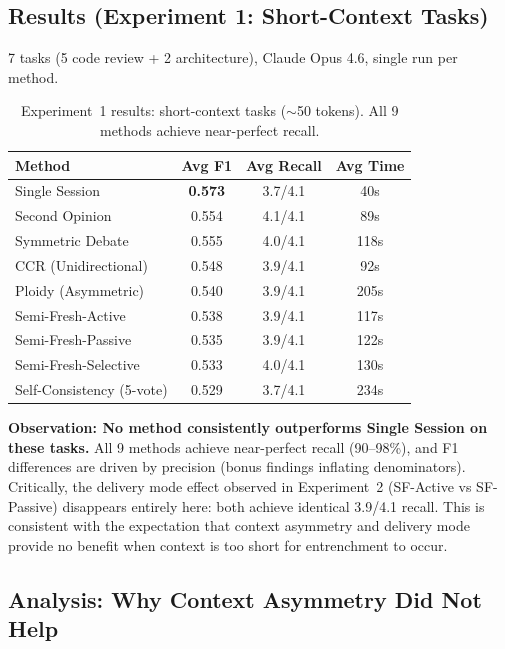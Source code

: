 \documentclass[11pt]{article}
\begin{document}
\subsection{Results (Experiment 1: Short-Context Tasks)}
\label{sec:exp1-results}

7 tasks (5 code review + 2 architecture), Claude Opus 4.6, single run per method.

\begin{table}[t]
\centering
\caption{Experiment~1 results: short-context tasks ($\sim$50 tokens). All 9 methods achieve near-perfect recall.}
\label{tab:exp1}
\small
\begin{tabular}{@{}lccc@{}}
\toprule
\textbf{Method} & \textbf{Avg F1} & \textbf{Avg Recall} & \textbf{Avg Time} \\
\midrule
Single Session            & \textbf{0.573} & 3.7/4.1 & 40s  \\
Second Opinion            & 0.554          & 4.1/4.1 & 89s  \\
Symmetric Debate          & 0.555          & 4.0/4.1 & 118s \\
CCR (Unidirectional)      & 0.548          & 3.9/4.1 & 92s  \\
Ploidy (Asymmetric)       & 0.540          & 3.9/4.1 & 205s \\
Semi-Fresh-Active         & 0.538          & 3.9/4.1 & 117s \\
Semi-Fresh-Passive        & 0.535          & 3.9/4.1 & 122s \\
Semi-Fresh-Selective      & 0.533          & 4.0/4.1 & 130s \\
Self-Consistency (5-vote) & 0.529          & 3.7/4.1 & 234s \\
\bottomrule
\end{tabular}
\end{table}

\textbf{Observation: No method consistently outperforms Single Session on these tasks.} All 9 methods achieve near-perfect recall (90--98\%), and F1 differences are driven by precision (bonus findings inflating denominators). Critically, the delivery mode effect observed in Experiment~2 (SF-Active vs SF-Passive) disappears entirely here: both achieve identical 3.9/4.1 recall. This is consistent with the expectation that context asymmetry and delivery mode provide no benefit when context is too short for entrenchment to occur.

\subsection{Analysis: Why Context Asymmetry Did Not Help}
\label{sec:why-no-help}
\end{document}
